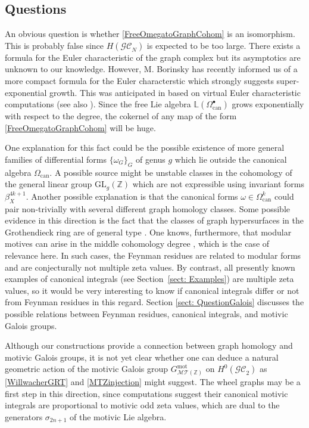 \documentclass[pdftex]{sigma}%
\numberwithin{equation}{section}
\newcommand{\Z}{\mathbb Z}
\newcommand{\GC}{\mathcal{GC}}
\newcommand{\can}{\mathrm{can}}
\newcommand{\GL}{\mathrm{GL}}
\newcommand{\0}{\color{blue}{\mathsf{0}}}
\begin{document}
\subsection{Questions}

An obvious question is whether \eqref{FreeOmegatoGraphCohom}
 is an isomorphism. This is probably false since $H(\GC_N)$ is expected to be too large.
There exists a formula for the Euler characteristic of the graph complex \cite{WZEulerCharacteristic} but its asymptotics are unknown to our knowledge. However,
M. Borinsky has recently informed us of a more compact formula \cite{BorinskyEuler} for the Euler characterstic which strongly suggests super-exponential growth. This was anticipated in \cite[Section~7.2]{Kontsevich93} based on virtual Euler characteristic computations (see also \cite{ EulerOutFn,GetzlerKapranov}). Since the free Lie algebra $\mathbb{L}\left(\Omega^{\bullet}_{\can} \right)$ grows exponentially with respect to the degree, the cokernel of any map of the form \eqref{FreeOmegatoGraphCohom} will be huge.

One explanation for this fact could be the possible existence of more general families of differential forms $\{\omega_G\}_G$ of genus $g$ which lie outside the canonical algebra $\Omega_{\can}$. A possible source might be unstable classes in the cohomology of the general linear group $\GL_g(\Z)$ which are not expressible using invariant forms $\beta_X^{4k+1}$. Another possible explanation is that the canonical forms $\omega \in \Omega^{k}_{\can}$ could pair non-trivially with several different graph homology classes. Some possible evidence in this direction is the fact that the classes of graph hypersurfaces in the Grothendieck ring are of general type \cite{BelkaleBrosnan}. One knows, furthermore, that modular motives can arise in the middle cohomology degree \cite{BrownDoryn, BrownSchnetz}, which is the case of relevance here. In such cases, the Feynman residues are related to modular forms and are conjecturally not multiple zeta values. By contrast, all presently known examples of canonical integrals (see Section~\ref{sect: Examples}) are multiple zeta values, so it would be very interesting to know if canonical integrals differ or not from Feynman residues in this regard. Section \ref{sect: QuestionGalois} discusses the possible relations between Feynman residues, canonical integrals, and motivic Galois groups.

Although our constructions provide a connection between graph homology and motivic Galois groups, it is not yet clear whether one can deduce a natural geometric action of the motivic Galois group $G^{\mathrm{mot}}_{\mathcal{MT}(\Z)
}$ on $H^0(\GC_2)$ as \eqref{WillwacherGRT} and \eqref{MTZinjection} might suggest. The wheel graphs may be a first step in this direction, since computations suggest their canonical motivic integrals are proportional to motivic odd zeta values, which are dual to the generators $\sigma_{2n+1}$ of the motivic Lie algebra.
\end{document}
